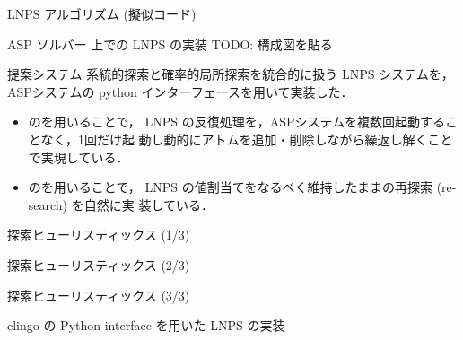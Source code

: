 \documentclass[11pt,dvipdfmx]{beamer}
\begin{document}
\begin{frame}{LNPS アルゴリズム (擬似コード)}

\end{frame}
\begin{frame}{ASP ソルバー 上での LNPS の実装}
\alert{TODO: 構成図を貼る}
  \begin{block}{提案システム}\centering
    系統的探索と確率的局所探索を統合的に扱う LNPS システムを，
    ASPシステム{\clingo}の python インターフェースを用いて実装した．
  \end{block}

  \begin{itemize}
  \item {\clingo}のを用いることで，
    LNPS の反復処理を，ASPシステムを複数回起動することなく，1回だけ起
    動し動的にアトムを追加・削除しながら繰返し解くことで実現している．
  \item {\clingo}のを用いることで，
    LNPS の値割当てをなるべく維持したままの再探索 (re-search) を自然に実
    装している．
  \end{itemize}

\end{frame}
\begin{frame}{探索ヒューリスティックス (1/3)}

\end{frame}
\begin{frame}{探索ヒューリスティックス (2/3)}

\end{frame}
\begin{frame}{探索ヒューリスティックス (3/3)}

\end{frame}
\begin{frame}{clingo の Python interface を用いた LNPS の実装}

\end{frame}
\end{document}
